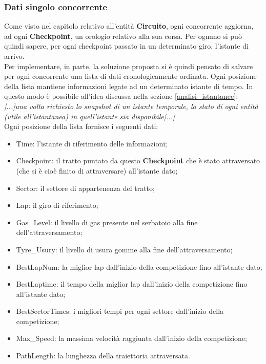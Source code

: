      \subsubsection{Dati singolo concorrente}
     \label{stat_competitor}
     Come visto nel capitolo relativo all'entità \textbf{Circuito}, ogni
concorrente aggiorna, ad ogni 
     \textbf{Checkpoint}, un orologio relativo alla sua corsa. Per ognuno si può
quindi sapere, per ogni checkpoint passato in un determinato giro,
     l'istante di arrivo.\\
     Per implementare, in parte, la soluzione proposta si è quindi pensato di
salvare per ogni concorrente una lista di dati cronologicamente ordinata.
     Ogni posizione della lista mantiene informazioni legate ad un determinato
istante di tempo. In questo modo è possibile all'idea discussa nella
     sezione \ref{analisi_istantanee}:\\
     \emph{[...]una volta richiesto lo snapshot di un istante temporale, lo
stato di ogni entità (utile all'istantanea) in 
     quell'istante sia disponibile[...]}\\
     Ogni posizione della lista fornisce i seguenti dati:
     \begin{itemize}
     \item Time: l'istante di riferimento delle informazioni;
     \item Checkpoint: il tratto puntato da questo \textbf{Checkpoint} che è
stato attraversato (che si è cioè finito di attraversare) 
     all'istante dato;
     \item Sector: il settore di appartenenza del tratto;
     \item Lap: il giro di riferimento;
     \item Gas\_Level: il livello di gas presente nel serbatoio alla fine
dell'attraversamento;
     \item Tyre\_Usury: il livello di usura gomme alla fine
dell'attraversamento;
     \item BestLapNum: la miglior lap dall'inizio della competizione fino
all'istante dato;
     \item BestLaptime: il tempo della miglior lap dall'inizio della
competizione fino all'istante dato;
     \item BestSectorTimes: i migliori tempi per ogni settore dall'inizio della
competizione;
     \item Max\_Speed: la massima velocità raggiunta dall'inizio della
competizione;
     \item PathLength: la lunghezza della traiettoria attraversata.
     \end{itemize}
